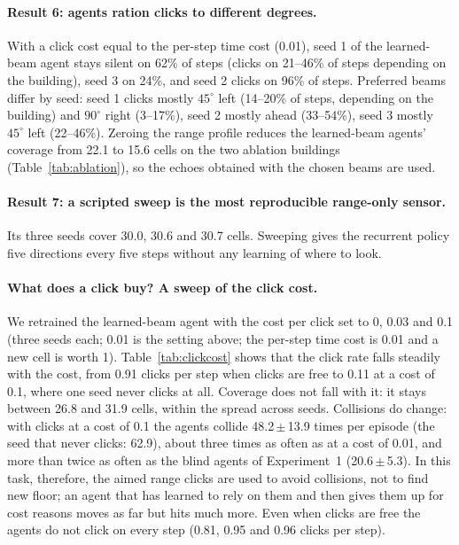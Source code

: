 \documentclass[10pt]{article}
\newcommand{\pmsd}[2]{#1\,{\scriptsize$\pm$\,#2}}
\begin{document}
\paragraph{Result 6: agents ration clicks to different degrees.} With a click cost equal to the per-step time cost (0.01), seed 1 of the learned-beam agent stays silent on 62\% of steps (clicks on 21--46\% of steps depending on the building), seed 3 on 24\%, and seed 2 clicks on 96\% of steps. Preferred beams differ by seed: seed 1 clicks mostly $45^\circ$ left (14--20\% of steps, depending on the building) and $90^\circ$ right (3--17\%), seed 2 mostly ahead (33--54\%), seed 3 mostly $45^\circ$ left (22--46\%). Zeroing the range profile reduces the learned-beam agents' coverage from 22.1 to 15.6 cells on the two ablation buildings (Table~\ref{tab:ablation}), so the echoes obtained with the chosen beams are used.

\paragraph{Result 7: a scripted sweep is the most reproducible range-only sensor.} Its three seeds cover 30.0, 30.6 and 30.7 cells. Sweeping gives the recurrent policy five directions every five steps without any learning of where to look.

\paragraph{What does a click buy? A sweep of the click cost.} We retrained the learned-beam agent with the cost per click set to 0, 0.03 and 0.1 (three seeds each; 0.01 is the setting above; the per-step time cost is 0.01 and a new cell is worth 1). Table~\ref{tab:clickcost} shows that the click rate falls steadily with the cost, from 0.91 clicks per step when clicks are free to 0.11 at a cost of 0.1, where one seed never clicks at all. Coverage does not fall with it: it stays between 26.8 and 31.9 cells, within the spread across seeds. Collisions do change: with clicks at a cost of 0.1 the agents collide \pmsd{48.2}{13.9} times per episode (the seed that never clicks: 62.9), about three times as often as at a cost of 0.01, and more than twice as often as the blind agents of Experiment~1 (\pmsd{20.6}{5.3}). In this task, therefore, the aimed range clicks are used to avoid collisions, not to find new floor; an agent that has learned to rely on them and then gives them up for cost reasons moves as far but hits much more. Even when clicks are free the agents do not click on every step (0.81, 0.95 and 0.96 clicks per step).
\end{document}
